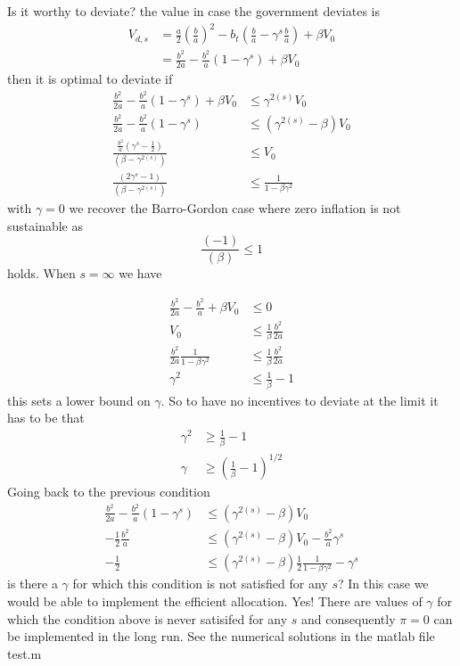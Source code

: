 \documentclass[12pt]{article}
\theoremstyle{definition}
\theoremstyle{plain}
\theoremstyle{plain}
\theoremstyle{remark}
\theoremstyle{plain}
\begin{document}
\justify
Is it worthy to deviate? the value in case the government deviates
is 
\begin{align*}
V_{d,s} & =\frac{a}{2}\left(\frac{b}{a}\right)^{2}-b_{t}(\frac{b}{a}-\gamma^{s}\frac{b}{a})+\beta V_{0}\\
 & =\frac{b^{2}}{2a}-\frac{b^{2}}{a}(1-\gamma^{s})+\beta V_{0}
\end{align*}
\justify
then it is optimal to deviate if 
\begin{align*}
\frac{b^{2}}{2a}-\frac{b^{2}}{a}(1-\gamma^{s})+\beta V_{0} & \leq\gamma^{2(s)}V_{0}\\
\frac{b^{2}}{2a}-\frac{b^{2}}{a}(1-\gamma^{s}) & \leq\left(\gamma^{2(s)}-\beta\right)V_{0}\\
\frac{\frac{b^{2}}{a}\left(\gamma^{s}-\frac{1}{2}\right)}{\left(\beta-\gamma^{2(s)}\right)} & \leq V_{0}\\
\frac{\left(2\gamma^{s}-1\right)}{\left(\beta-\gamma^{2(s)}\right)} & \leq\frac{1}{1-\beta\gamma^{2}}
\end{align*}
\justify
with $\gamma=0$ we recover the Barro-Gordon case where zero inflation
is not sustainable as 
\[
\frac{\left(-1\right)}{\left(\beta\right)}\leq1
\]
\justify
holds.
\justify
When $s=\infty$ we have 

\begin{align*}
\frac{b^{2}}{2a}-\frac{b^{2}}{a}+\beta V_{0} & \leq0\\
V_{0} & \leq\frac{1}{\beta}\frac{b^{2}}{2a}\\
\frac{b^{2}}{2a}\frac{1}{1-\beta\gamma^{2}} & \leq\frac{1}{\beta}\frac{b^{2}}{2a}\\
\gamma^{2} & \leq\frac{1}{\beta}-1
\end{align*}
\justify
this sets a lower bound on $\gamma$. So to have no incentives to
deviate at the limit it has to be that 
\begin{align*}
\gamma^{2} & \geq\frac{1}{\beta}-1\\
\gamma & \geq\left(\frac{1}{\beta}-1\right)^{1/2}
\end{align*}
\justify
Going back to the previous condition
\begin{align*}
\frac{b^{2}}{2a}-\frac{b^{2}}{a}(1-\gamma^{s}) & \leq\left(\gamma^{2(s)}-\beta\right)V_{0}\\
-\frac{1}{2}\frac{b^{2}}{a} & \leq\left(\gamma^{2(s)}-\beta\right)V_{0}-\frac{b^{2}}{a}\gamma^{s}\\
-\frac{1}{2} & \leq\left(\gamma^{2(s)}-\beta\right)\frac{1}{2}\frac{1}{1-\beta\gamma^{2}}-\gamma^{s}
\end{align*}
\justify
is there a $\gamma$ for which this condition is not satisfied for
any $s$? In this case we would be able to implement the efficient
allocation. 
\justify
Yes! There are values of $\gamma$ for which the condition above is
never satisifed for any $s$ and consequently $\pi=0$ can be implemented
in the long run. See the numerical solutions in the matlab file test.m
\end{document}
